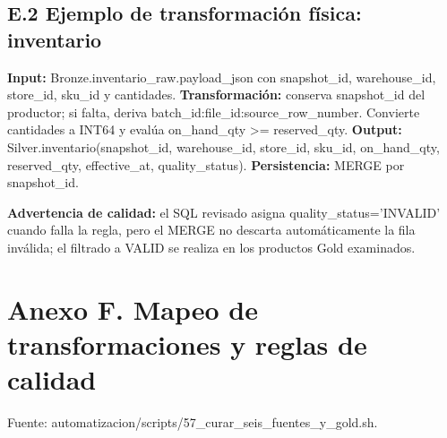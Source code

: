\documentclass[11pt]{article}
\begin{document}
\subsection{E.2 Ejemplo de transformación física: inventario}

\textbf{Input:} Bronze.inventario\_\allowbreak{}raw.payload\_\allowbreak{}json con snapshot\_\allowbreak{}id, warehouse\_\allowbreak{}id, store\_\allowbreak{}id, sku\_\allowbreak{}id y cantidades. \textbf{Transformación:} conserva snapshot\_\allowbreak{}id del productor; si falta, deriva batch\_\allowbreak{}id:file\_\allowbreak{}id:source\_\allowbreak{}row\_\allowbreak{}number. Convierte cantidades a INT64 y evalúa on\_\allowbreak{}hand\_\allowbreak{}qty >= reserved\_\allowbreak{}qty. \textbf{Output:} Silver.inventario(snapshot\_\allowbreak{}id, warehouse\_\allowbreak{}id, store\_\allowbreak{}id, sku\_\allowbreak{}id, on\_\allowbreak{}hand\_\allowbreak{}qty, reserved\_\allowbreak{}qty, effective\_\allowbreak{}at, quality\_\allowbreak{}status). \textbf{Persistencia:} MERGE por snapshot\_\allowbreak{}id.\par

\textbf{Advertencia de calidad:} el SQL revisado asigna quality\_\allowbreak{}status='INVALID' cuando falla la regla, pero el MERGE no descarta automáticamente la fila inválida; el filtrado a VALID se realiza en los productos Gold examinados.\par




\clearpage
\section*{Anexo F. Mapeo de transformaciones y reglas de calidad}

Fuente: automatizacion/\allowbreak{}scripts/\allowbreak{}57\_\allowbreak{}curar\_\allowbreak{}seis\_\allowbreak{}fuentes\_\allowbreak{}y\_\allowbreak{}gold.sh.\par
\end{document}
